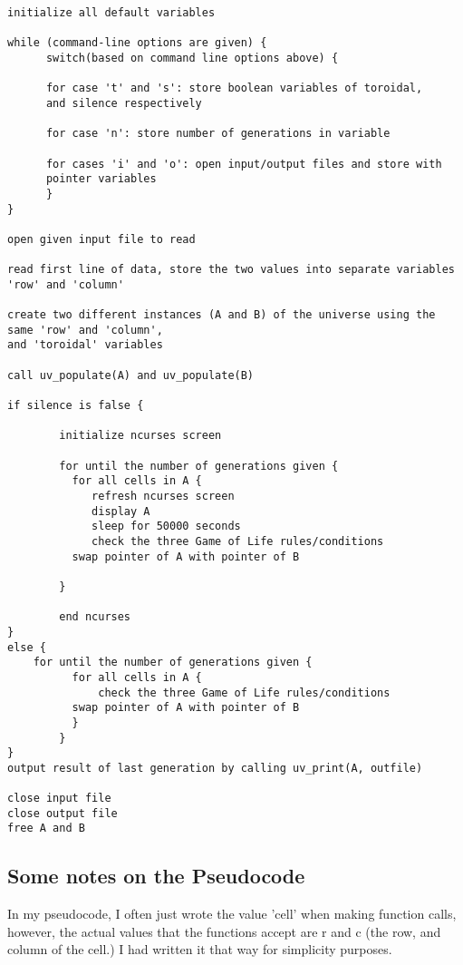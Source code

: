 \documentclass[11pt]{article}
\begin{document}
\begin{verbatim}
initialize all default variables

while (command-line options are given) {
      switch(based on command line options above) {
      
      for case 't' and 's': store boolean variables of toroidal, 
      and silence respectively
      
      for case 'n': store number of generations in variable 
      
      for cases 'i' and 'o': open input/output files and store with 
      pointer variables
      }
}

open given input file to read 

read first line of data, store the two values into separate variables 'row' and 'column'

create two different instances (A and B) of the universe using the same 'row' and 'column', 
and 'toroidal' variables

call uv_populate(A) and uv_populate(B)

if silence is false {

        initialize ncurses screen
        
        for until the number of generations given {
          for all cells in A {
             refresh ncurses screen
             display A
             sleep for 50000 seconds
             check the three Game of Life rules/conditions
          swap pointer of A with pointer of B
          
        }
        
        end ncurses
}
else {
	for until the number of generations given {
          for all cells in A {
              check the three Game of Life rules/conditions
          swap pointer of A with pointer of B
          }
        }
}
output result of last generation by calling uv_print(A, outfile)            

close input file
close output file
free A and B
\end{verbatim}

\subsection{Some notes on the Pseudocode}
In my pseudocode, I often just wrote the value 'cell' when making function calls, however, the actual values that the functions accept are r and c (the row, and column of the cell.) I had written it that way for simplicity purposes.
\end{document}
